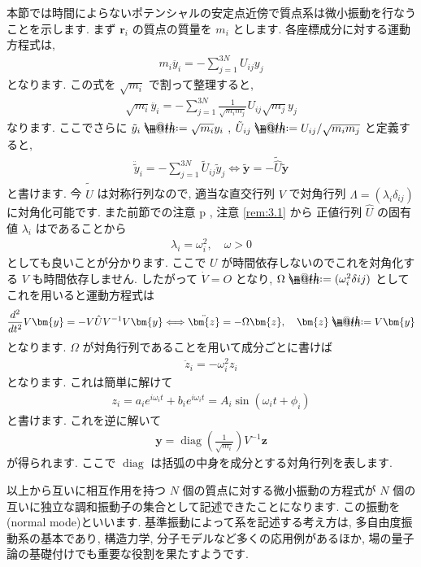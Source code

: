 \documentclass[openany, a4paper, oneside]{book}
\makeatletter
\newcommand*{\defeq}{\mathrel{\rlap{%
\raisebox{0.3ex}{$\m@th\cdot$}}%
\raisebox{-0.3ex}{$\m@th\cdot$}}%
=}
\DeclareMathOperator{\diag}{diag}
\theoremstyle{break}
\theoremstyle{breakdefn}
\makeatother
\begin{document}
本節では時間によらないポテンシャルの安定点近傍で質点系は微小振動を行なうことを示します.
まず $\bm{r}_i$ の質点の質量を $m_i$ とします.
各座標成分に対する運動方程式は,
\begin{align}
m_i \ddot{ y_i }
=
-\sum_{j=1}^{3N} U_{ij} y_j
\end{align}
となります. この式を $\sqrt{m_i}$ で割って整理すると,
\begin{align}
\sqrt{m_i} \ddot{ y_i }
=
-\sum_{j=1}^{3N} \frac{1} {\sqrt{m_i m_j}} U_{ij} \sqrt{m_j} y_j
\end{align}
なります. ここでさらに
$\tilde{y}_i \defeq \sqrt{m_i} y_i$ ,  $\tilde{U}_{ij} \defeq U_{ij}/\sqrt{ m_i m_j }$ と定義すると,
\begin{gather}
\ddot{ \tilde{y} }_i
=
-\sum_{j=1}^{3N} \tilde{ U }_{ij} \tilde{y}_j
\Longleftrightarrow
\tilde{ \bm{y} }
=
-\tilde{ \hat{U} } \tilde{ \bm{y} }
\end{gather}
と書けます.
今 $\tilde{ \hat{U} }$ は対称行列なので, 適当な直交行列 $V$ で対角行列 $\Lambda = ( \lambda_i \delta_{ij} )$ に対角化可能です.
また前節での注意 p \pageref{rem:3.1}, 注意 \ref{rem:3.1} から
正値行列 $\hat{U}$ の固有値 $\lambda_i$ はであることから
\begin{align}
\lambda _i
=
\omega _i ^2, \quad
\omega > 0
\end{align}
としても良いことが分かります.
ここで $U$ が時間依存しないのでこれを対角化する $V$ も時間依存しません.
したがって $\dot{V}=O$ となり,  $\Omega \defeq ( \omega_i^2 \delta{ij} )$ としてこれを用いると運動方程式は
\begin{gather}
\frac{d^2} {dt^2} V \bm{y}
=
-V \hat{U} V^{-1} V \bm{y}
\Longleftrightarrow
\ddot{ \bm{z} }
=
-\Omega \bm{z}, \quad
\bm{z} \defeq V \bm{y}
\end{gather}
となります.
$\Omega$ が対角行列であることを用いて成分ごとに書けば
\begin{align}
\ddot{z}_i
=
-\omega_i ^2 z_i
\end{align}
となります.
これは簡単に解けて
\begin{align}
z_i
=
a_i e^{ i \omega_i t} + b_i e^{ i \omega_i t }
=
A_i \sin ( \omega_i t + \phi_i )
\end{align}
と書けます. これを逆に解いて
\begin{align}
\bm{y}
=
\diag \left ( \frac{1} { \sqrt{m_i} } \right) V^{-1} \bm{z}
\end{align}
が得られます.
ここで $\diag$ は括弧の中身を成分とする対角行列を表します.

以上から互いに相互作用を持つ $N$ 個の質点に対する微小振動の方程式が
$N$ 個の互いに独立な調和振動子の集合として記述できたことになります.
この振動を(normal mode)といいます.
基準振動によって系を記述する考え方は, 多自由度振動系の基本であり,
構造力学, 分子モデルなど多くの応用例があるほか, 場の量子論の基礎付けでも重要な役割を果たすようです.
\end{document}
